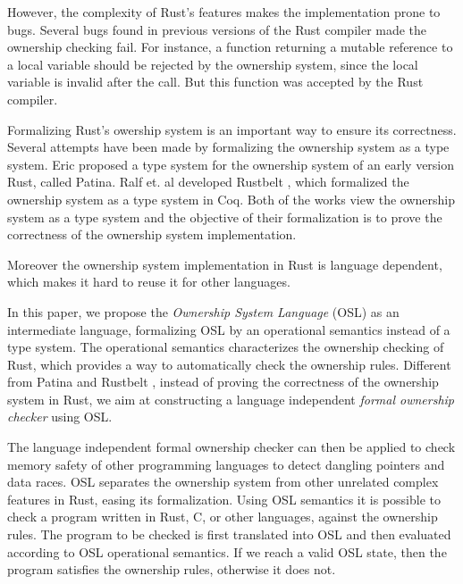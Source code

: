 \documentclass[runningheads]{llncs}
\begin{document}


However, the complexity of Rust's features makes the implementation prone to bugs.
Several bugs \cite{Niko2018} found in previous versions of the Rust compiler made the ownership checking fail. For instance, a function returning
a mutable reference to a local variable
should be rejected by the ownership system, 
 since the local variable is invalid after the call.
 But this function was accepted by the Rust compiler\cite{Casper2017}.
 
 
Formalizing Rust's owership system is an important way to ensure its correctness.
%
Several attempts have been made by formalizing the ownership system as a type system.
Eric \cite{Eric2015} proposed a type system for the ownership system of an early version Rust, called Patina.
Ralf et. al developed Rustbelt \cite{Ralf2018},  which
formalized the ownership system as a type system in Coq.
Both of the works view the ownership system as a type system and the objective of their formalization is to prove the correctness of the ownership system implementation.

Moreover the ownership system implementation in Rust is language dependent, which makes it hard to reuse  it for other languages.


In this paper, we propose the {\em Ownership System Language} (OSL) as an intermediate language,
 formalizing OSL by an operational semantics instead of a type system.
 The operational semantics characterizes the ownership checking of Rust, which provides a way
 to automatically check the ownership rules.
Different from Patina \cite{Eric2015} and Rustbelt \cite{Ralf2018}, instead of proving the
 correctness of the ownership system in Rust, we aim at constructing a language independent \emph{formal ownership checker} using OSL. 
 
 The  language independent formal ownership checker  can then be applied to check memory safety of other programming languages to detect dangling pointers and data races.
OSL separates the ownership system from other unrelated complex features in Rust, easing its formalization.
Using OSL semantics it is possible to check a program written in Rust, C, or other languages, against the ownership rules. The program to be checked is first translated into OSL and then evaluated according to OSL operational semantics.
If we reach a valid OSL state, then the program satisfies the ownership rules, otherwise it does not.
\end{document}

